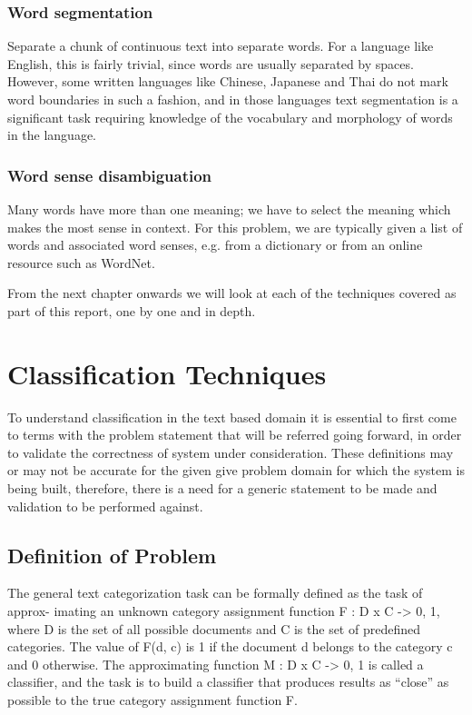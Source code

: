 \documentclass[12pt]{book}
\begin{document}
\subsection{Word segmentation}
Separate a chunk of continuous text into separate words. For a language like English, this is fairly trivial, since words are usually separated by spaces. However, some written languages like Chinese, Japanese and Thai do not mark word boundaries in such a fashion, and in those languages text segmentation is a significant task requiring knowledge of the vocabulary and morphology of words in the language.
\subsection{Word sense disambiguation}
Many words have more than one meaning; we have to select the meaning which makes the most sense in context. For this problem, we are typically given a list of words and associated word senses, e.g. from a dictionary or from an online resource such as WordNet.

\vspace{2cm}
From the next chapter onwards we will look at each of the techniques covered as part of this report, one by one and in depth.



\chapter{Classification Techniques}

To understand classification in the text based domain it is essential to first come to terms with the problem statement that will be referred going forward, in order to validate the correctness of system under consideration. These definitions
may or may not be accurate for the given give problem domain for which the system is being built, therefore, there is a need for a generic statement to be made and validation to be performed against. 

\section{Definition of Problem}
The general text categorization task can be formally defined as the task of approx- imating an unknown category assignment function F : D x C -> {0, 1}, where D is the set of all possible documents and C is the set of predefined categories. The value of F(d, c) is 1 if the document d belongs to the category c and 0 otherwise. The approximating function M : D x C -> {0, 1} is called a classifier, and the task is to build a classifier that produces results as “close” as possible to the true category assignment function F.
\end{document}
